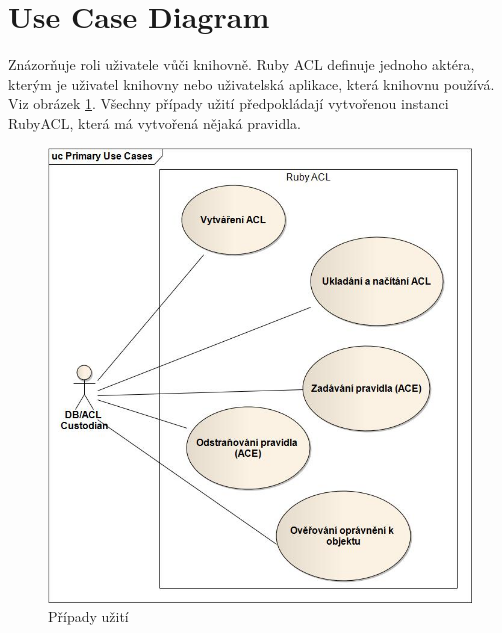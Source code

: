 \documentclass[11pt,twoside,a4paper]{book}
\begin{document}
\section{Use Case Diagram}
Znázorňuje roli uživatele vůči knihovně. Ruby ACL definuje jednoho aktéra, kterým je uživatel knihovny nebo uživatelská aplikace, která knihovnu používá. Viz obrázek \ref{fig:usecase}. 
Všechny případy užití předpokládají vytvořenou instanci RubyACL, která má vytvořená nějaká pravidla.
\begin{figure}
\includegraphics[width=15cm]{UseCases.jpg}
\caption{Případy užití}
\label{fig:usecase}
\end{figure}
\end{document}
